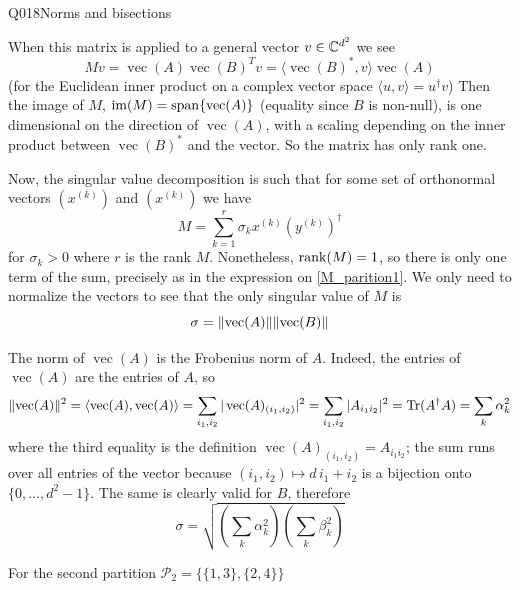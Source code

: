 \begin{entry}{Q018}{Norms and bisections}
\begin{solution}[a]
When this matrix is applied to a general vector $v \in \mathbb{C}^{d^2}$ we see
\begin{equation}
    Mv = \operatorname{vec}(A) \operatorname{vec}(B)^Tv = \langle\operatorname{vec}(B)^*,v \rangle \operatorname{vec}(A)
\end{equation}
(for the Euclidean inner product on a complex vector space $\langle u,v\rangle=u^\dagger v$)
Then the image of $M$, $\operatorname{im}(M)=  \operatorname{span} \{ \operatorname{vec}(A)\}$ (equality since $B$ is non-null), is one dimensional on the direction of $ \operatorname{vec}(A)$, with a scaling depending on the inner product between $\operatorname{vec}(B)^*$ and the vector. So the matrix has only rank one.

Now, the singular value decomposition is such that for some set of orthonormal vectors $(x^{(k)})$ and $(x^{(k)})$ we have
\begin{equation}
    M = \sum_{k=1}^{r}  \sigma_k x^{(k)}(y^{(k)})^\dagger
\end{equation}
for $\sigma_k>0$ where $r$ is the rank $M$. Nonetheless, $\operatorname{rank}(M)=1$, so there is only one term of the sum, precisely as in  the expression on \eqref{M_parition1}. We only need to normalize the vectors to see that the only singular value of $M$ is 
\begin{equation}
    \sigma=\lVert\operatorname{vec}(A)\rVert\lVert\operatorname{vec}(B)\rVert
\end{equation}

The norm of $\operatorname{vec}(A)$ is the Frobenius norm of $A$. Indeed, the entries
of $\operatorname{vec}(A)$ are the entries of $A$, so
\begin{equation}
\begin{split}
     \lVert\operatorname{vec}(A)\rVert^2
     = \langle\operatorname{vec}(A), \operatorname{vec}(A) \rangle
     = \sum_{i_1,i_2} |\operatorname{vec}(A)_{(i_1,i_2)}|^2
     = \sum_{i_1,i_2} |A_{i_1 i_2}|^2
     = \operatorname{Tr}(A^\dagger A) = \sum_k \alpha_k^2
\end{split}
\end{equation}
where the third equality is the definition
$\operatorname{vec}(A)_{(i_1,i_2)}=A_{i_1 i_2}$; the sum runs over all entries of the
vector because $(i_1,i_2)\mapsto d\,i_1+i_2$ is a bijection onto $\{0,\dots,d^2-1\}$.
The same is clearly valid for $B$, therefore 
\begin{equation}
    \sigma=\sqrt{\left(\sum_k \alpha_k^2\right) \left(\sum_k \beta_k^2\right) }
\end{equation}


For the second partition $\mathcal{P}_2=\{\{1,3\},\{2,4\}\}$


\end{solution}
\end{entry}
